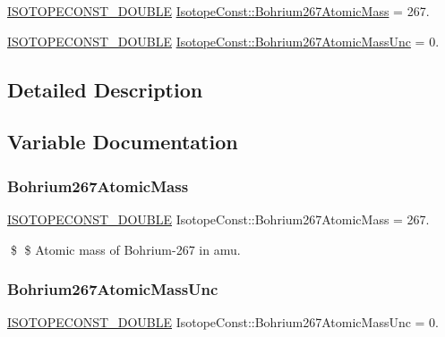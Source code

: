 \begin{DoxyCompactItemize}
\item 
\mbox{\hyperlink{group___isotope_const-_macros_ga8f45a7272ce02c0b4c65c44636ed719a}{I\+S\+O\+T\+O\+P\+E\+C\+O\+N\+S\+T\+\_\+\+D\+O\+U\+B\+LE}} \mbox{\hyperlink{group___isotope_const-_bohrium-_bh267_gaed639b511e4a253ecdce0fedb29a09f2}{Isotope\+Const\+::\+Bohrium267\+Atomic\+Mass}} = 267.
\item 
\mbox{\hyperlink{group___isotope_const-_macros_ga8f45a7272ce02c0b4c65c44636ed719a}{I\+S\+O\+T\+O\+P\+E\+C\+O\+N\+S\+T\+\_\+\+D\+O\+U\+B\+LE}} \mbox{\hyperlink{group___isotope_const-_bohrium-_bh267_ga1a3f1112259e8da2b68e029be50d89d6}{Isotope\+Const\+::\+Bohrium267\+Atomic\+Mass\+Unc}} = 0.
\end{DoxyCompactItemize}


\subsection{Detailed Description}


\subsection{Variable Documentation}
\mbox{\label{group___isotope_const-_bohrium-_bh267_gaed639b511e4a253ecdce0fedb29a09f2}} 
\subsubsection{\texorpdfstring{Bohrium267\+Atomic\+Mass}{Bohrium267AtomicMass}}
{\footnotesize\ttfamily \mbox{\hyperlink{group___isotope_const-_macros_ga8f45a7272ce02c0b4c65c44636ed719a}{I\+S\+O\+T\+O\+P\+E\+C\+O\+N\+S\+T\+\_\+\+D\+O\+U\+B\+LE}} Isotope\+Const\+::\+Bohrium267\+Atomic\+Mass = 267.}

\$ \$ Atomic mass of Bohrium-\/267 in amu. \mbox{\label{group___isotope_const-_bohrium-_bh267_ga1a3f1112259e8da2b68e029be50d89d6}} 
\subsubsection{\texorpdfstring{Bohrium267\+Atomic\+Mass\+Unc}{Bohrium267AtomicMassUnc}}
{\footnotesize\ttfamily \mbox{\hyperlink{group___isotope_const-_macros_ga8f45a7272ce02c0b4c65c44636ed719a}{I\+S\+O\+T\+O\+P\+E\+C\+O\+N\+S\+T\+\_\+\+D\+O\+U\+B\+LE}} Isotope\+Const\+::\+Bohrium267\+Atomic\+Mass\+Unc = 0.}

